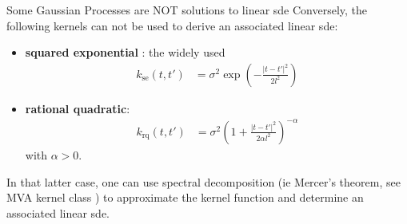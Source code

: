 \begin{frame}{Some Gaussian Processes are NOT solutions to linear \gls{sde}}
    Conversely, the following kernels can not be used to derive an associated linear \gls{sde}:

\begin{itemize}
    \item \textbf{squared exponential} : the widely used
    \begin{align}
        k_{\text{se}}(t,t') &= \sigma^{2} \exp{\left(
            - \frac{\vert t-t' \vert^{2}}{2l^{2}}
        \right)}
    \end{align}
    \item \textbf{rational quadratic}:
    \begin{align}
        k_{\text{rq}}(t,t') &= \sigma^{2} \left(
            1 + \frac{\vert t-t' \vert^{2}}{2 \alpha l^{2}}
        \right)^{-\alpha}
    \end{align}
    with $\alpha > 0$.
\end{itemize}

In that latter case, one can use spectral decomposition (ie Mercer's theorem, see MVA kernel class \cite{mva_kernel_class}) 
to approximate the kernel function and determine an associated linear \gls{sde}.
\end{frame}
